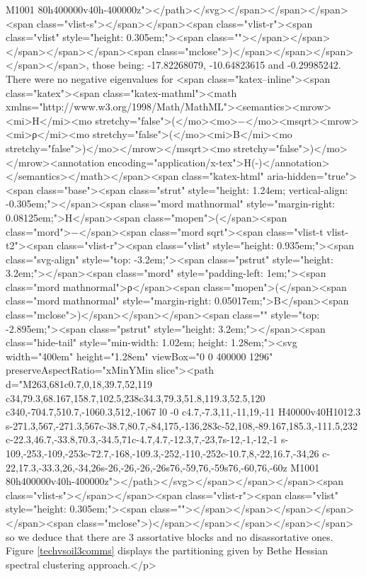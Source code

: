 M1001 80h400000v40h-400000z"></path></svg></span></span></span><span class="vlist-s">​</span></span><span class="vlist-r"><span class="vlist" style="height: 0.305em;"><span class=""></span></span></span></span></span><span class="mclose">)</span></span></span></span></span>, those being: -17.82268079, -10.64823615 and  -0.29985242. There were no negative eigenvalues for <span class="katex--inline"><span class="katex"><span class="katex-mathml"><math xmlns="http://www.w3.org/1998/Math/MathML"><semantics><mrow><mi>H</mi><mo stretchy="false">(</mo><mo>−</mo><msqrt><mrow><mi>ρ</mi><mo stretchy="false">(</mo><mi>B</mi><mo stretchy="false">)</mo></mrow></msqrt><mo stretchy="false">)</mo></mrow><annotation encoding="application/x-tex">H(-)</annotation></semantics></math></span><span class="katex-html" aria-hidden="true"><span class="base"><span class="strut" style="height: 1.24em; vertical-align: -0.305em;"></span><span class="mord mathnormal" style="margin-right: 0.08125em;">H</span><span class="mopen">(</span><span class="mord">−</span><span class="mord sqrt"><span class="vlist-t vlist-t2"><span class="vlist-r"><span class="vlist" style="height: 0.935em;"><span class="svg-align" style="top: -3.2em;"><span class="pstrut" style="height: 3.2em;"></span><span class="mord" style="padding-left: 1em;"><span class="mord mathnormal">ρ</span><span class="mopen">(</span><span class="mord mathnormal" style="margin-right: 0.05017em;">B</span><span class="mclose">)</span></span></span><span class="" style="top: -2.895em;"><span class="pstrut" style="height: 3.2em;"></span><span class="hide-tail" style="min-width: 1.02em; height: 1.28em;"><svg width="400em" height="1.28em" viewBox="0 0 400000 1296" preserveAspectRatio="xMinYMin slice"><path d="M263,681c0.7,0,18,39.7,52,119
c34,79.3,68.167,158.7,102.5,238c34.3,79.3,51.8,119.3,52.5,120
c340,-704.7,510.7,-1060.3,512,-1067
l0 -0
c4.7,-7.3,11,-11,19,-11
H40000v40H1012.3
s-271.3,567,-271.3,567c-38.7,80.7,-84,175,-136,283c-52,108,-89.167,185.3,-111.5,232
c-22.3,46.7,-33.8,70.3,-34.5,71c-4.7,4.7,-12.3,7,-23,7s-12,-1,-12,-1
s-109,-253,-109,-253c-72.7,-168,-109.3,-252,-110,-252c-10.7,8,-22,16.7,-34,26
c-22,17.3,-33.3,26,-34,26s-26,-26,-26,-26s76,-59,76,-59s76,-60,76,-60z
M1001 80h400000v40h-400000z"></path></svg></span></span></span><span class="vlist-s">​</span></span><span class="vlist-r"><span class="vlist" style="height: 0.305em;"><span class=""></span></span></span></span></span><span class="mclose">)</span></span></span></span></span> so we deduce that there are 3 assortative blocks and no disassortative ones. Figure \ref{techvsoil3comms} displays the partitioning given by Bethe Hessian spectral clustering approach.</p>
